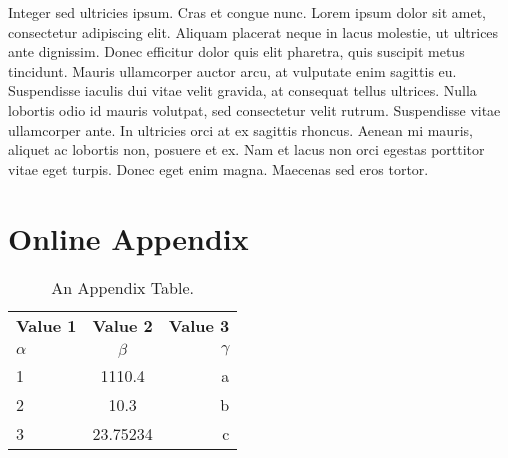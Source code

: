 \documentclass[man]{apa7}
\begin{document}
Integer sed ultricies ipsum. Cras et congue nunc. Lorem ipsum dolor sit amet, consectetur adipiscing elit. Aliquam placerat neque in lacus molestie, ut ultrices ante dignissim. Donec efficitur dolor quis elit pharetra, quis suscipit metus tincidunt. Mauris ullamcorper auctor arcu, at vulputate enim sagittis eu. Suspendisse iaculis dui vitae velit gravida, at consequat tellus ultrices. Nulla lobortis odio id mauris volutpat, sed consectetur velit rutrum. Suspendisse vitae ullamcorper ante. In ultricies orci at ex sagittis rhoncus. Aenean mi mauris, aliquet ac lobortis non, posuere et ex. Nam et lacus non orci egestas porttitor vitae eget turpis. Donec eget enim magna. Maecenas sed eros tortor.

\begingroup
\parindent 0pt
\def\enotesize{\normalsize}
\theendnotes
\endgroup

\printbibliography

\appendix

\section{Online Appendix}

\begin{table}
	\begin{center}
		\caption{An Appendix Table.}
		\label{tab:apptable}
		\begin{tabular}{l|c|r} %
			\textbf{Value 1} & \textbf{Value 2} & \textbf{Value 3}\\
			$\alpha$ & $\beta$ & $\gamma$ \\
			\hline
			1 & 1110.4 & a\\
			2 & 10.3 & b\\
			3 & 23.75234 & c\\
		\end{tabular}
	\end{center}
\end{table}
\end{document}

